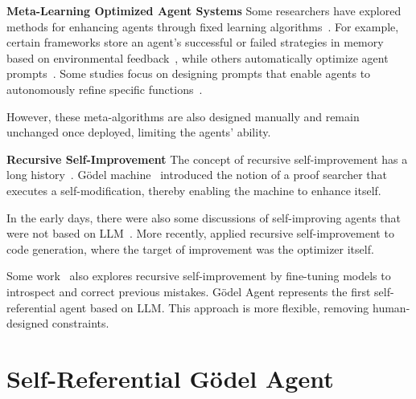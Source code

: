\documentclass[11pt]{article}
\newcommand{\godel}{G\"odel\xspace}
\newcommand{\framework}{Gödel Agent\xspace}
\begin{document}
\noindent\textbf{Meta-Learning Optimized Agent Systems} \quad
Some researchers have explored methods for enhancing agents through fixed learning algorithms~\citep{zhou2024symbolic,hu2024automated}. For example, certain frameworks store an agent’s successful or failed strategies in memory based on environmental feedback~\citep{liu2023think,hu2023chatdb,qian2024investigateconsolidateexploitgeneralstrategyintertask}, while others automatically optimize agent prompts~\citep{khattab2023dspy,zhang2024agent,khattab2023dspy}. Some studies focus on designing prompts that enable agents to autonomously refine specific functions~\citep{zhangoffline}. 

However, these meta-algorithms are also designed manually and remain unchanged once deployed, limiting the agents' ability.

\noindent\textbf{Recursive Self-Improvement} \quad
The concept of recursive self-improvement has a long history~\citep{good1966speculations,schmidhuber1987evolutionary}.  \godel machine~\citep{schmidhuber2003godel} introduced the notion of a proof searcher that executes a self-modification, thereby enabling the machine to enhance itself.

In the early days, there were also some discussions of self-improving agents that were not based on LLM~\citep{hall2007self,steunebrink2012towards}.
More recently, \citet{zelikman2023self} applied recursive self-improvement to code generation, where the target of improvement was the optimizer itself.




Some work~\citep{havrilla2024glorewhenwhereimprove,qu2024recursiveintrospectionteachinglanguage,kumar2024traininglanguagemodelsselfcorrect} also explores recursive self-improvement by fine-tuning models to introspect and correct previous mistakes.
\framework represents the first self-referential agent based on LLM. This approach is more flexible, removing human-designed constraints.



\section{Self-Referential \framework{}}
\end{document}
